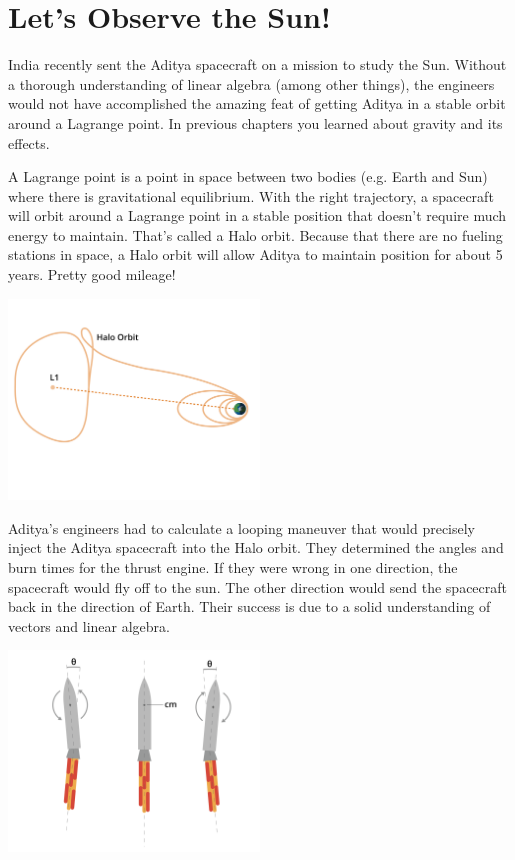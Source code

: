 \section{Let's Observe the Sun!}
India recently sent the Aditya spacecraft on a mission to study the Sun. Without a thorough understanding of linear algebra (among other things), the engineers would not have accomplished the amazing feat of getting Aditya in a stable orbit around a Lagrange point. In previous chapters you learned about gravity and its effects. 

A Lagrange point is a point in space between two bodies (e.g. Earth and Sun) where there is gravitational equilibrium. With the right trajectory, a spacecraft will orbit around a Lagrange point in a stable position that doesn’t require much energy to maintain. That’s called a Halo orbit. Because that there are no fueling stations in space, a Halo orbit will allow Aditya to maintain position for about 5 years. Pretty good mileage!

\includegraphics[width=0.5\textwidth]{adityaOrbit.png}

Aditya’s engineers had to calculate a looping maneuver that would precisely inject the Aditya spacecraft into the Halo orbit. They determined the angles and burn times for the thrust engine. If they were wrong in one direction, the spacecraft would fly off to the sun. The other direction would send the spacecraft back in the direction of Earth. Their success is due to a solid understanding of vectors and linear algebra.

\includegraphics[width=0.5\textwidth]{gimbalEngine.png}

